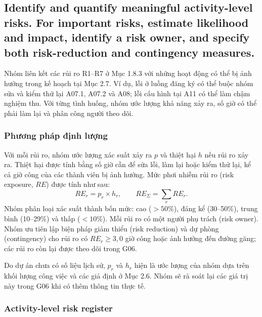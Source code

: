 
\subsection{Identify and quantify meaningful activity-level risks. For important risks, estimate likelihood and impact, identify a risk owner, and specify both risk-reduction and contingency measures.}

Nhóm liên kết các rủi ro R1--R7 ở Mục 1.8.3 với những hoạt động có thể bị ảnh hưởng trong kế hoạch tại Mục 2.7. Ví dụ, lỗi ở luồng đăng ký có thể buộc nhóm sửa và kiểm thử lại A07.1, A07.2 và A08; lỗi cấu hình tại A11 có thể làm chậm nghiệm thu. Với từng tình huống, nhóm ước lượng khả năng xảy ra, số giờ có thể phải làm lại và phân công người theo dõi.

\subsubsection{Phương pháp định lượng}

Với mỗi rủi ro, nhóm ước lượng xác suất xảy ra $p$ và thiệt hại $h$ nếu rủi ro xảy ra. Thiệt hại được tính bằng số giờ cần để sửa lỗi, làm lại hoặc kiểm thử lại, kể cả giờ công của các thành viên bị ảnh hưởng. Mức phơi nhiễm rủi ro (risk exposure, $RE$) được tính như sau:
\[
RE_r = p_r \times h_r , \qquad RE_{\Sigma} = \sum_r RE_r .
\]
Nhóm phân loại xác suất thành bốn mức: cao ($>50\%$), đáng kể (30--50\%), trung bình (10--29\%) và thấp ($<10\%$). Mỗi rủi ro có một người phụ trách (risk owner). Nhóm ưu tiên lập biện pháp giảm thiểu (risk reduction) và dự phòng (contingency) cho rủi ro có $RE_r \ge 3{,}0$ giờ công hoặc ảnh hưởng đến đường găng; các rủi ro còn lại được theo dõi trong G06.

Do dự án chưa có số liệu lịch sử, $p_r$ và $h_r$ hiện là ước lượng của nhóm dựa trên khối lượng công việc và các giả định ở Mục 2.6. Nhóm sẽ rà soát lại các giá trị này trong G06 khi có thêm thông tin thực tế.

\subsubsection{Activity-level risk register}


